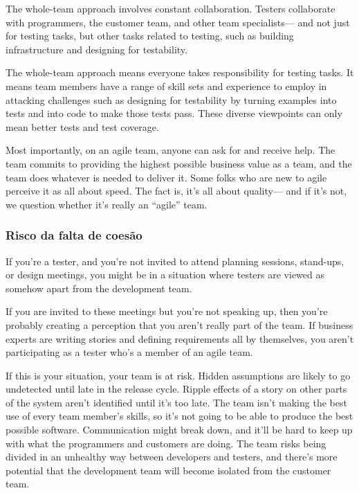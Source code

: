 \documentclass[
	12pt,				%
	openright,			%
	oneside,			%
	a4paper,			%
	english,			%
	brazil,				%
	]{abntex2}
\begin{document}
The whole-team approach involves constant collaboration. Testers collaborate with programmers, the customer team, and other team specialists— and not just for testing tasks, but other tasks related to testing, such as building infrastructure and designing for testability.

The whole-team approach means everyone takes responsibility for testing tasks. It means team members have a range of skill sets and experience to employ in attacking challenges such as designing for testability by turning examples into tests and into code to make those tests pass. These diverse viewpoints can only mean better tests and test coverage.

Most importantly, on an agile team, anyone can ask for and receive help. The team commits to providing the highest possible business value as a team, and the team does whatever is needed to deliver it. Some folks who are new to agile perceive it as all about speed. The fact is, it’s all about quality— and if it’s not, we question whether it’s really an “agile” team.

\subsubsection{Risco da falta de coesão}
If you’re a tester, and you’re not invited to attend planning sessions, stand-ups, or design meetings, you might be in a situation where testers are viewed as somehow apart from the development team.

If you are invited to these meetings but you’re not speaking up, then you’re probably creating a perception that you aren’t really part of the team. If business experts are writing stories and defining requirements all by themselves, you aren’t participating as a tester who’s a member of an agile team.

If this is your situation, your team is at risk. Hidden assumptions are likely to go undetected until late in the release cycle. Ripple effects of a story on other parts of the system aren’t identified until it’s too late. The team isn’t making the best use of every team member’s skills, so it’s not going to be able to produce the best possible software. Communication might break down, and it’ll be hard to keep up with what the programmers and customers are doing. The team risks being divided in an unhealthy way between developers and testers, and there’s more potential that the development team will become isolated from the customer team.
\end{document}
